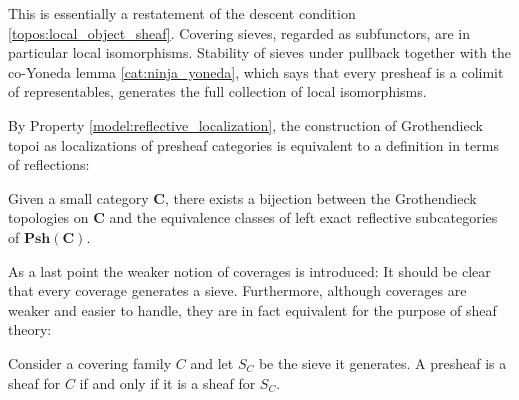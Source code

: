     \begin{remark}
        This is essentially a restatement of the descent condition \ref{topos:local_object_sheaf}. Covering sieves, regarded as subfunctors, are in particular local isomorphisms. Stability of sieves under pullback together with the co-Yoneda lemma \ref{cat:ninja_yoneda}, which says that every presheaf is a colimit of representables, generates the full collection of local isomorphisms.
    \end{remark}
    By Property \ref{model:reflective_localization}, the construction of Grothendieck topoi as localizations of presheaf categories is equivalent to a definition in terms of reflections:
    \begin{result}
        Given a small category $\mathbf{C}$, there exists a bijection between the Grothendieck topologies on $\mathbf{C}$ and the equivalence classes of left exact reflective subcategories of $\mathbf{Psh(C)}$.
    \end{result}

    As a last point the weaker notion of coverages is introduced:
    It should be clear that every coverage generates a sieve. Furthermore, although coverages are weaker and easier to handle, they are in fact equivalent for the purpose of sheaf theory:
    \begin{property}
        Consider a covering family $C$ and let $S_C$ be the sieve it generates. A presheaf is a sheaf for $C$ if and only if it is a sheaf for $S_C$.
    \end{property}


